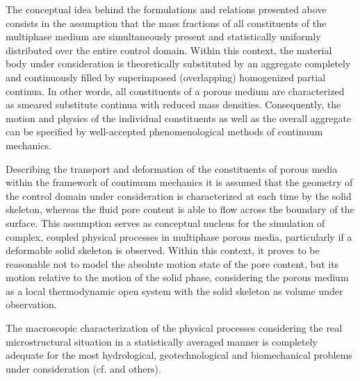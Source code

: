 The conceptual idea behind the formulations and relations presented above consists in the assumption that the mass fractions of all constituents of the multiphase medium are simultaneously present and statistically uniformly distributed over the entire control domain. Within this context, the material body under consideration is theoretically substituted by an aggregate completely and continuously filled by superimposed (overlapping) homogenized partial continua. In other words, all constituents of a porous medium are characterized as smeared substitute continua with reduced mass densities. Consequently, the motion and physics of the individual constituents as well as the overall aggregate can be specified by well-accepted phenomenological methods of continuum mechanics.

Describing the transport and deformation of the constituents of porous media within the framework of continuum mechanics it is assumed that the geometry of the control domain under consideration is characterized at each time by the solid skeleton, whereas the fluid pore content is able to flow across the boundary of the surface. This assumption serves as conceptual nucleus for the simulation of complex, coupled physical processes in multiphase porous media, particularly if a deformable solid skeleton is observed. Within this context, it proves to be reasonable not to model the absolute motion state of the pore content, but its motion relative to the motion of the solid phase, considering the porous medium as a local thermodynamic open system with the solid skeleton as volume under observation.

The macroscopic characterization of the physical processes considering the real microstructural situation in a statistically averaged manner is completely adequate for the most hydrological, geotechnological and biomechanical problems under consideration (cf. \cite{GWASG:2006} and others).